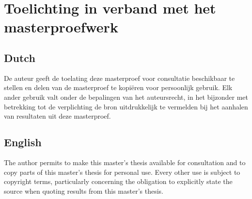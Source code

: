 \chapter*{Toelichting in verband met het masterproefwerk}

\section*{Dutch}
De auteur geeft de toelating deze masterproef voor consultatie beschikbaar te stellen en delen van de masterproef te kopiëren voor persoonlijk gebruik. Elk ander gebruik valt onder de bepalingen van het auteursrecht, in het bijzonder met betrekking tot de verplichting de bron uitdrukkelijk te vermelden bij het aanhalen van resultaten uit deze masterproef.

\section*{English}
The author permits to make this master’s thesis available for consultation and to copy parts of this master’s thesis for personal use. Every other use is subject to copyright terms, particularly concerning the obligation to explicitly state the source when quoting results from this master’s thesis.